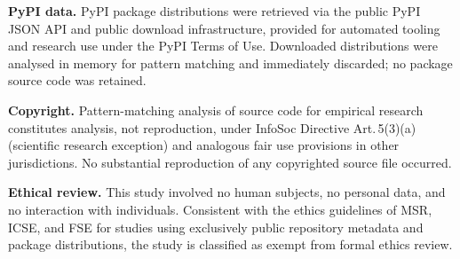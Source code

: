 \documentclass[conference]{IEEEtran}
\begin{document}
\textbf{PyPI data.}  PyPI package distributions were retrieved via the
public PyPI JSON API and public download infrastructure, provided for
automated tooling and research use under the PyPI Terms of Use.
Downloaded distributions were analysed in memory for pattern matching
and immediately discarded; no package source code was retained.

\textbf{Copyright.}  Pattern-matching analysis of source code for
empirical research constitutes analysis, not reproduction, under InfoSoc
Directive Art.\,5(3)(a) (scientific research exception) and analogous
fair use provisions in other jurisdictions.  No substantial reproduction
of any copyrighted source file occurred.

\textbf{Ethical review.}  This study involved no human subjects, no
personal data, and no interaction with individuals.  Consistent with the
ethics guidelines of MSR, ICSE, and FSE for studies using exclusively
public repository metadata and package distributions, the study is
classified as exempt from formal ethics review.
\end{document}

